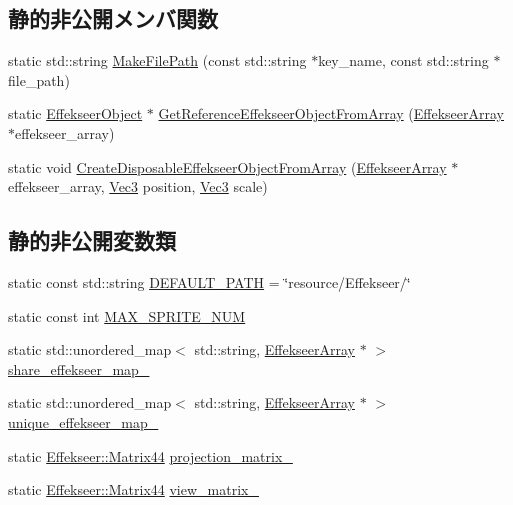 \subsection*{静的非公開メンバ関数}
\begin{DoxyCompactItemize}
\item 
static std\+::string \mbox{\hyperlink{class_effekseer_manager_ad6c9359de20c955af42a72c145571168}{Make\+File\+Path}} (const std\+::string $\ast$key\+\_\+name, const std\+::string $\ast$file\+\_\+path)
\item 
static \mbox{\hyperlink{class_effekseer_object}{Effekseer\+Object}} $\ast$ \mbox{\hyperlink{class_effekseer_manager_a1469d014a3d10dd38dc7d03db7f2ebfe}{Get\+Reference\+Effekseer\+Object\+From\+Array}} (\mbox{\hyperlink{class_effekseer_array}{Effekseer\+Array}} $\ast$effekseer\+\_\+array)
\item 
static void \mbox{\hyperlink{class_effekseer_manager_ab8fd5fdd35e1336974f217797c010ee3}{Create\+Disposable\+Effekseer\+Object\+From\+Array}} (\mbox{\hyperlink{class_effekseer_array}{Effekseer\+Array}} $\ast$effekseer\+\_\+array, \mbox{\hyperlink{_vector3_d_8h_ab16f59e4393f29a01ec8b9bbbabbe65d}{Vec3}} position, \mbox{\hyperlink{_vector3_d_8h_ab16f59e4393f29a01ec8b9bbbabbe65d}{Vec3}} scale)
\end{DoxyCompactItemize}
\subsection*{静的非公開変数類}
\begin{DoxyCompactItemize}
\item 
static const std\+::string \mbox{\hyperlink{class_effekseer_manager_a9a849a395605383e9c7e7850379e8b22}{D\+E\+F\+A\+U\+L\+T\+\_\+\+P\+A\+TH}} = \char`\"{}resource/Effekseer/\char`\"{}
\item 
static const int \mbox{\hyperlink{class_effekseer_manager_a4d87b5a997a223ae8b253a9eab025c3f}{M\+A\+X\+\_\+\+S\+P\+R\+I\+T\+E\+\_\+\+N\+UM}}
\item 
static std\+::unordered\+\_\+map$<$ std\+::string, \mbox{\hyperlink{class_effekseer_array}{Effekseer\+Array}} $\ast$ $>$ \mbox{\hyperlink{class_effekseer_manager_a67498df05e8dda8654dd5e8a35318c95}{share\+\_\+effekseer\+\_\+map\+\_\+}}
\item 
static std\+::unordered\+\_\+map$<$ std\+::string, \mbox{\hyperlink{class_effekseer_array}{Effekseer\+Array}} $\ast$ $>$ \mbox{\hyperlink{class_effekseer_manager_a6ac2968072bfe7f1077a7f78c2b968e6}{unique\+\_\+effekseer\+\_\+map\+\_\+}}
\item 
static \mbox{\hyperlink{struct_effekseer_1_1_matrix44}{Effekseer\+::\+Matrix44}} \mbox{\hyperlink{class_effekseer_manager_a04d1e978c13b53e668ac3c56c6a92b3a}{projection\+\_\+matrix\+\_\+}}
\item 
static \mbox{\hyperlink{struct_effekseer_1_1_matrix44}{Effekseer\+::\+Matrix44}} \mbox{\hyperlink{class_effekseer_manager_a0ea3c32637818a3fab28fb7d17a03970}{view\+\_\+matrix\+\_\+}}
\end{DoxyCompactItemize}


